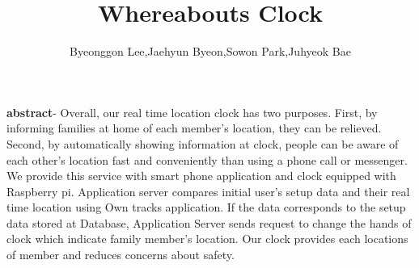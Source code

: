 \documentclass[10pt,a4paper,twocolumn]{report}
\begin{document}
\title{Whereabouts Clock}
\author{Byeonggon Lee,Jaehyun Byeon,Sowon Park,Juhyeok Bae}
\maketitle




\textbf{abstract}- Overall, our real time location clock has two purposes. First, by informing families at home of each member’s location, they can be relieved. Second, by automatically showing information at clock, people can be aware of each other's location fast and conveniently than using a phone call or messenger. We provide this service with smart phone application and clock equipped with Raspberry pi. Application server compares initial user's setup data and their real time location using Own tracks application. If the data corresponds to the setup data stored at Database, Application Server sends request to change the hands of clock which indicate family member’s location. Our clock provides each locations of member and reduces concerns about safety.
\end{document}
